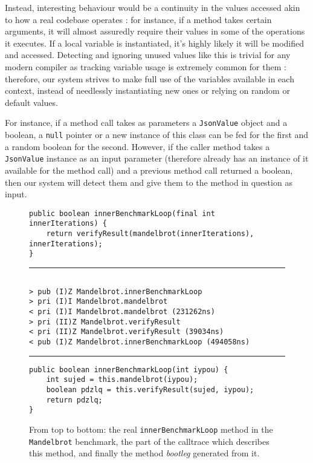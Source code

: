 \documentclass[12pt]{article}
\begin{document}
Instead, interesting behaviour would be a continuity in the values accessed akin to how a real codebase operates : for instance, if a method takes certain arguments, it will almost assuredly require their values in some of the operations it executes. If a local variable is instantiated, it's highly likely it will be modified and accessed. Detecting and ignoring unused values like this is trivial for any modern compiler as tracking variable usage is extremely common for them : therefore, our system strives to make full use of the variables available in each context, instead of needlessly instantiating new ones or relying on random or default values.

For instance, if a method call takes as parameters a \texttt{JsonValue} object and a boolean, a \texttt{null} pointer or a new instance of this class can be fed for the first and a random boolean for the second. However, if the caller method takes a \texttt{JsonValue} instance as an input parameter (therefore already has an instance of it available for the method call) and a previous method call returned a boolean, then our system will detect them and give them to the method in question as input.

\begin{figure}[h!]
\begin{lstlisting}
public boolean innerBenchmarkLoop(final int innerIterations) {
	return verifyResult(mandelbrot(innerIterations), innerIterations);
}
\end{lstlisting}
\hrule
\begin{Verbatim}

> pub (I)Z Mandelbrot.innerBenchmarkLoop
> pri (I)I Mandelbrot.mandelbrot
< pri (I)I Mandelbrot.mandelbrot (231262ns)
> pri (II)Z Mandelbrot.verifyResult
< pri (II)Z Mandelbrot.verifyResult (39034ns)
< pub (I)Z Mandelbrot.innerBenchmarkLoop (494058ns)
\end{Verbatim}
\hrule
\begin{lstlisting}
public boolean innerBenchmarkLoop(int iypou) {
	int sujed = this.mandelbrot(iypou);
	boolean pdzlq = this.verifyResult(sujed, iypou);
	return pdzlq;
}
\end{lstlisting}
\captionsetup{justification=centering}
\caption{From top to bottom: the real \texttt{innerBenchmarkLoop} method in the \texttt{Mandelbrot} benchmark, the part of the calltrace which describes this method, and finally the method \textit{bootleg} generated from it.}
\label{fig:mandelbrot_method}
\end{figure}
\end{document}
